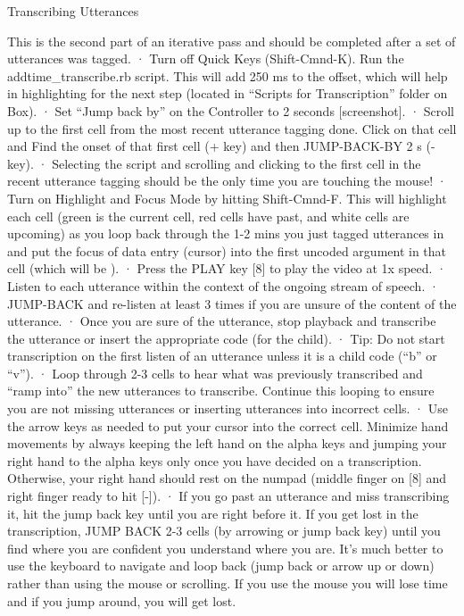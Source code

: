 \documentclass[
  12pt,
]{book}
\begin{document}
Transcribing Utterances

This is the second part of an iterative pass and should be completed after a set of utterances was tagged.
· Turn off Quick Keys (Shift-Cmnd-K).
Run the addtime\_transcribe.rb script. This will add 250 ms to the offset, which will help in highlighting for the next step (located in ``Scripts for Transcription'' folder on Box).
· Set ``Jump back by'' on the Controller to 2 seconds {[}screenshot{]}.
· Scroll up to the first cell from the most recent utterance tagging done. Click on that cell and Find the onset of that first cell (+ key) and then JUMP-BACK-BY 2 s (- key).
· Selecting the script and scrolling and clicking to the first cell in the recent utterance tagging should be the only time you are touching the mouse!
· Turn on Highlight and Focus Mode by hitting Shift-Cmnd-F. This will highlight each cell (green is the current cell, red cells have past, and white cells are upcoming) as you loop back through the 1-2 mins you just tagged utterances in and put the focus of data entry (cursor) into the first uncoded argument in that cell (which will be ).
· Press the PLAY key {[}8{]} to play the video at 1x speed.
· Listen to each utterance within the context of the ongoing stream of speech.
· JUMP-BACK and re-listen at least 3 times if you are unsure of the content of the utterance.
· Once you are sure of the utterance, stop playback and transcribe the utterance or insert the appropriate code (for the child).
· Tip: Do not start transcription on the first listen of an utterance unless it is a child code (``b'' or ``v'').
· Loop through 2-3 cells to hear what was previously transcribed and ``ramp into'' the new utterances to transcribe. Continue this looping to ensure you are not missing utterances or inserting utterances into incorrect cells.
· Use the arrow keys as needed to put your cursor into the correct cell. Minimize hand movements by always keeping the left hand on the alpha keys and jumping your right hand to the alpha keys only once you have decided on a transcription. Otherwise, your right hand should rest on the numpad (middle finger on {[}8{]} and right finger ready to hit {[}-{]}).
· If you go past an utterance and miss transcribing it, hit the jump back key until you are right before it. If you get lost in the transcription, JUMP BACK 2-3 cells (by arrowing or jump back key) until you find where you are confident you understand where you are. It's much better to use the keyboard to navigate and loop back (jump back or arrow up or down) rather than using the mouse or scrolling. If you use the mouse you will lose time and if you jump around, you will get lost.
\end{document}
